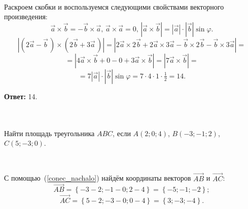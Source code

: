\documentclass[10pt]{article}
\numberwithin{primer}{section}
\numberwithin{equation}{section}
\begin{document}
\noindent{}\,\hrulefill\vspace{4pt}

Раскроем скобки и воспользуемся следующими свойствами векторного произведения: \[\vec{a}\times\vec{b}=-\vec{b}\times\vec{a},\, \vec{a}\times\vec{a}=0,\,
\left|\vec{a}\times\vec{b}\right|=\left|\vec{a}\right|\cdot|\vec{b}|\sin\varphi.\]
\begin{equation*}
\left|(2\vec{a}-\vec{b}\,)\times(2\vec{b}+3\vec{a}\,)\right|=
\left|2\vec{a}\times2\vec{b}+2\vec{a}\times3\vec{a}-\vec{b}\times2\vec{b}
-\vec{b}\times3\vec{a}\right|=
\end{equation*}
\begin{equation*}
=\left|4\vec{a}\times\vec{b}+0-0+3\vec{a}\times\vec{b}\right|=\left|7\vec{a}\times\vec{b}\right|=
\end{equation*}
\begin{equation*}
=7\left|\vec{a}\right|\cdot|\vec{b}|\sin\varphi=7\cdot4\cdot1\cdot\tfrac{1}{2}=14.
\end{equation*}

\noindent\textbf{Ответ: }14.\vspace{4pt}


\noindent\hrulefill\,\,\hrulefill\\

\vspace*{-0.5cm}\noindent{}\vspace{4pt}\\
Найти площадь треугольника $ABC$, если $A(2;0;4)$, $B(-3;-1;2)$, \\$C(5;-3;0)$.

\noindent{}\,\hrulefill\vspace{4pt}

С помощью~(\ref{conec_nachalo}) найдём координаты векторов $\overrightarrow{AB}$ и $\overrightarrow{AC}$:
\[
\overrightarrow{AB}=\left\{-3-2;-1-0;2-4\right\}=\left\{-5;-1;-2\right\};
\]
\[
\overrightarrow{AC}=\left\{5-2;-3-0;0-4\right\}=\left\{3;-3;-4\right\}.
\]
\end{document}
